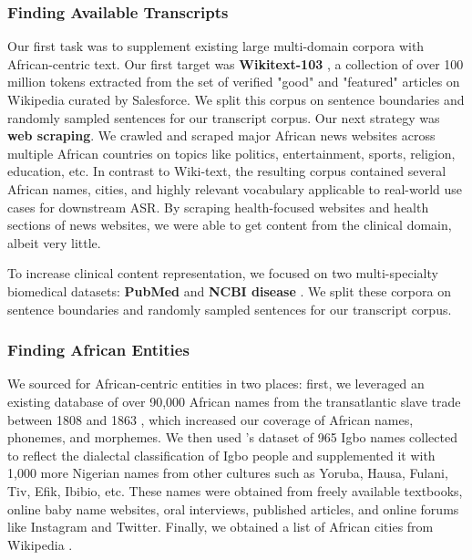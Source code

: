 \documentclass[11pt,a4paper]{article}
\begin{document}
\subsubsection{Finding Available Transcripts}
\label{findingtranscripts}
Our first task was to supplement existing large multi-domain corpora with African-centric text. Our first target was \textbf{Wikitext-103} \citep{merity2016pointer}, a collection of over 100 million tokens extracted from the set of verified "good" and "featured" articles on Wikipedia curated by Salesforce. We split this corpus on sentence boundaries and randomly sampled sentences for our transcript corpus. Our next strategy was \textbf{web scraping}. We crawled and scraped major African news websites across multiple African countries on topics like politics, entertainment, sports, religion, education, etc. In contrast to Wiki-text, the resulting corpus contained several African names, cities, and highly relevant vocabulary applicable to real-world use cases for downstream ASR. By scraping health-focused websites and health sections of news websites, we were able to get content from the clinical domain, albeit very little.

To increase clinical content representation, we focused on two multi-specialty biomedical datasets: \textbf{PubMed} \citep{wheeler2007database} and \textbf{NCBI disease} \citep{dougan2014ncbi}. We split these corpora on sentence boundaries and randomly sampled sentences for our transcript corpus. %

\subsubsection{Finding African Entities}
\label{finding_entities}
 We sourced for African-centric entities in two places: first, we leveraged an existing database of over 90,000 African names from the transatlantic slave trade between 1808 and 1863 \citep{anderson2013using}, which increased our coverage of African names, phonemes, and morphemes. We then used \citet{okagbue2017personal}'s dataset of 965 Igbo names collected to reflect the dialectal classification of Igbo people and supplemented it with 1,000 more Nigerian names from other cultures such as Yoruba, Hausa, Fulani, Tiv, Efik, Ibibio, etc. These names were obtained from freely available textbooks, online baby name websites, oral interviews, published articles, and online forums like Instagram and Twitter. Finally, we obtained a list of African cities from Wikipedia \citep{enwiki:1146587606}. %
\end{document}
